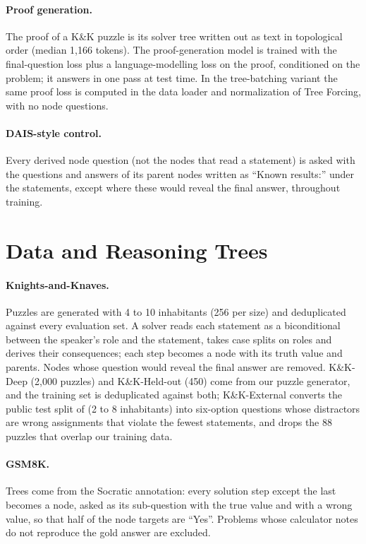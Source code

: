 \documentclass[10pt]{article}
\newcommand{\tf}{Tree Forcing}
\begin{document}
\paragraph{Proof generation.} The proof of a K\&K puzzle is its solver tree written out as text in topological order
(median 1,166 tokens). The proof-generation model is trained with the final-question loss plus a language-modelling
loss on the proof, conditioned on the problem; it answers in one pass at test time. In the tree-batching variant the
same proof loss is computed in the data loader and normalization of \tf{}, with no node questions.
\paragraph{DAIS-style control.} Every derived node question (not the nodes that read a statement) is asked with the
questions and answers of its parent nodes written as ``Known results:'' under the statements, except where these would
reveal the final answer, throughout training.

\section{Data and Reasoning Trees}
\label{app:data}
\paragraph{Knights-and-Knaves.} Puzzles are generated with 4 to 10 inhabitants (256 per size) and deduplicated against
every evaluation set. A solver reads each statement as a biconditional between the speaker's role and the statement,
takes case splits on roles and derives their consequences; each step becomes a node with its truth value and parents.
Nodes whose question would reveal the final answer are removed. K\&K-Deep (2,000 puzzles) and K\&K-Held-out (450) come from
our puzzle generator, and the training set is deduplicated against both; K\&K-External converts the public test split of \citet{xie2024kk} (2
to 8 inhabitants) into six-option questions whose distractors are wrong assignments that violate the fewest statements,
and drops the 88 puzzles that overlap our training data.
\paragraph{GSM8K.} Trees come from the Socratic annotation: every solution step except the last becomes a node, asked
as its sub-question with the true value and with a wrong value, so that half of the node targets are ``Yes''. Problems
whose calculator notes do not reproduce the gold answer are excluded.
\end{document}

